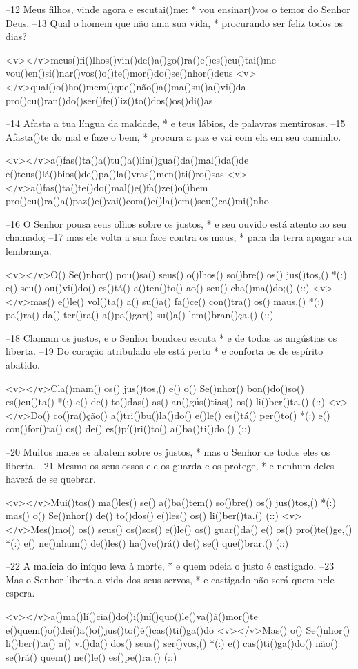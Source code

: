 –12 Meus filhos, vinde agora e escutai()me: *
vou ensinar()vos o temor do Senhor Deus.
–13 Qual o homem que não ama sua vida, *
procurando ser feliz todos os dias?

<v></v>meus()fi()lhos()vin()de()a()go()ra()e()es()cu()tai()me
vou()en()si()nar()vos()o()te()mor()do()se()nhor()deus
<v></v>qual()o()ho()mem()que()não()a()ma()su()a()vi()da
pro()cu()ran()do()ser()fe()liz()to()dos()os()di()as

–14 Afasta a tua língua da maldade, *
e teus lábios, de palavras mentirosas.
–15 Afasta()te do mal e faze o bem, *
procura a paz e vai com ela em seu caminho.

<v></v>a()fas()ta()a()tu()a()lín()gua()da()mal()da()de
e()teus()lá()bios()de()pa()la()vras()men()ti()ro()sas
<v></v>a()fas()ta()te()do()mal()e()fa()ze()o()bem
pro()cu()ra()a()paz()e()vai()com()e()la()em()seu()ca()mi()nho

–16 O Senhor pousa seus olhos sobre os justos, *
e seu ouvido está atento ao seu chamado;
–17 mas ele volta a sua face contra os maus, *
para da terra apagar sua lembrança.

<v></v>O() Se()nhor() pou()sa() seus() o()lhos() so()bre() os() jus()tos,() *(:)
e() seu() ou()vi()do() es()tá() a()ten()to() ao() seu() cha()ma()do;() (::)
<v></v>mas() e()le() vol()ta() a() su()a() fa()ce() con()tra() os() maus,() *(:)
pa()ra() da() ter()ra() a()pa()gar() su()a() lem()bran()ça.() (::)

–18 Clamam os justos, e o Senhor bondoso escuta *
e de todas as angústias os liberta.
–19 Do coração atribulado ele está perto *
e conforta os de espírito abatido.

<v></v>Cla()mam() os() jus()tos,() e() o() Se()nhor() bon()do()so() es()cu()ta() *(:)
e() de() to()das() as() an()gús()tias() os() li()ber()ta.() (::)
<v></v>Do() co()ra()ção() a()tri()bu()la()do() e()le() es()tá() per()to() *(:)
e() con()for()ta() os() de() es()pí()ri()to() a()ba()ti()do.() (::)

–20 Muitos males se abatem sobre os justos, *
mas o Senhor de todos eles os liberta.
–21 Mesmo os seus ossos ele os guarda e os protege, *
e nenhum deles haverá de se quebrar.

<v></v>Mui()tos() ma()les() se() a()ba()tem() so()bre() os() jus()tos,() *(:)
mas() o() Se()nhor() de() to()dos() e()les() os() li()ber()ta.() (::)
<v></v>Mes()mo() os() seus() os()sos() e()le() os() guar()da() e() os() pro()te()ge,() *(:)
e() ne()nhum() de()les() ha()ve()rá() de() se() que()brar.() (::)

–22 A malícia do iníquo leva à morte, *
e quem odeia o justo é castigado.
–23 Mas o Senhor liberta a vida dos seus servos, *
e castigado não será quem nele espera.

<v></v>a()ma()lí()cia()do()i()ní()quo()le()va()à()mor()te
e()quem()o()dei()a()o()jus()to()é()cas()ti()ga()do
<v></v>Mas() o() Se()nhor() li()ber()ta() a() vi()da() dos() seus() ser()vos,() *(:)
e() cas()ti()ga()do() não() se()rá() quem() ne()le() es()pe()ra.() (::)